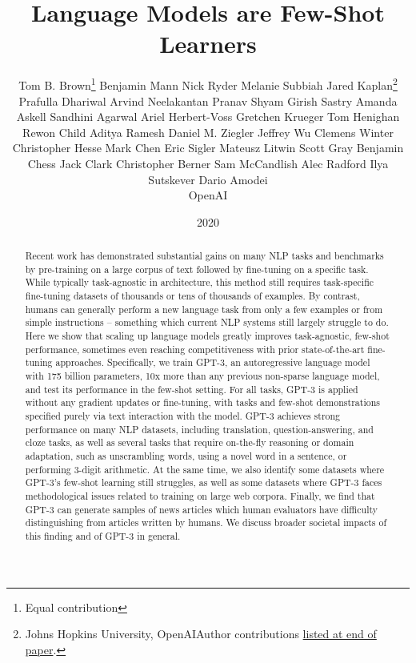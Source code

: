 \documentclass{article}
\title{Language Models are Few-Shot Learners}
\author{
Tom B. Brown\thanks{Equal contribution}
\And
Benjamin Mann\footnotemark[1]
\And
Nick Ryder\footnotemark[1]
\And
Melanie Subbiah\footnotemark[1]
\AND
Jared Kaplan\thanks{Johns Hopkins University, OpenAI\newline\newline Author contributions \hyperref[sec:contributions]{listed at end of paper}.}
\And
Prafulla Dhariwal
\And
Arvind Neelakantan
\And
Pranav Shyam
\And
Girish Sastry
\And
Amanda Askell
\And
Sandhini Agarwal
\And
Ariel Herbert-Voss
\And
Gretchen Krueger
\And
Tom Henighan
\And
Rewon Child
\And
Aditya Ramesh
\And
Daniel M. Ziegler
\And
Jeffrey Wu
\And
Clemens Winter
\AND
Christopher Hesse
\And
Mark Chen
\And
Eric Sigler
\And
Mateusz Litwin
\And
Scott Gray
\AND
Benjamin Chess
\And
Jack Clark
\And
Christopher Berner
\AND
Sam McCandlish
\And
Alec Radford
\And
Ilya Sutskever
\And
Dario Amodei 
\AND
\\
{\large OpenAI}
}
\date{2020}
\begin{document}
\maketitle
\begin{abstract}
Recent work has demonstrated substantial gains on many NLP tasks and benchmarks by pre-training on a large corpus of text followed by fine-tuning on a specific task. While typically task-agnostic in architecture, this method still requires task-specific fine-tuning datasets of thousands or tens of thousands of examples. By contrast, humans can generally perform a new language task from only a few examples or from simple instructions – something which current NLP systems still largely struggle to do. Here we show that scaling up language models greatly improves task-agnostic, few-shot performance, sometimes even reaching competitiveness with prior state-of-the-art fine-tuning approaches. Specifically, we train GPT-3, an autoregressive language model with 175 billion parameters, 10x more than any previous non-sparse language model, and test its performance in the few-shot setting.  For all tasks, GPT-3 is applied without any gradient updates or fine-tuning, with tasks and few-shot demonstrations specified purely via text interaction with the model.  GPT-3 achieves strong performance on many NLP datasets, including translation, question-answering, and cloze tasks, as well as several tasks that require on-the-fly reasoning or domain adaptation, such as unscrambling words, using a novel word in a sentence, or performing 3-digit arithmetic. At the same time, we also identify some datasets where GPT-3's few-shot learning still struggles, as well as some datasets where GPT-3 faces methodological issues related to training on large web corpora. Finally, we find that GPT-3 can generate samples of news articles which human evaluators have difficulty distinguishing from articles written by humans.  We discuss broader societal impacts of this finding and of GPT-3 in general.
\end{abstract}

\newpage
\setcounter{tocdepth}{2}
\tableofcontents
\newpage

\setcounter{footnote}{0}
\makeatletter
\let\@fnsymbol\@arabic
\makeatother
\end{document}

